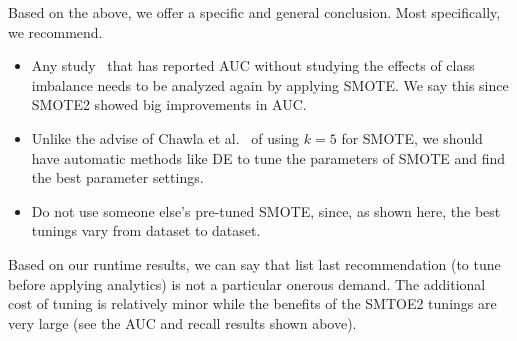 \documentclass[sigconf,review, anonymous]{acmart}
\newcommand{\bi}{\begin{itemize}[leftmargin=0.4cm]}
\newcommand{\ei}{\end{itemize}}
\theoremstyle{break}
\theoremstyle{break}
\begin{document}
Based on the above, we offer a specific and general conclusion. Most specifically, we recommend.
\bi
 \item Any study~\cite{ghotra2015revisiting} that has reported AUC without studying the effects of class imbalance needs to be analyzed again by applying SMOTE. We say this since SMOTE2 showed big improvements in AUC.
 \item Unlike the advise of Chawla et al.~\cite{chawla2002smote} of using $k=5$ for SMOTE, we should have automatic methods like DE to tune the parameters of SMOTE and find the best parameter settings.
 \item Do not use someone else's pre-tuned SMOTE, since, as shown here, the best tunings vary from dataset to dataset.
\ei
Based on our runtime results, we can say that list last
recommendation (to tune before applying analytics) is not  a particular
onerous demand. The additional cost of tuning
is relatively minor while the benefits of the SMTOE2 tunings
are very large (see the   AUC and recall results shown above).



\balance


\medskip

\end{document}
